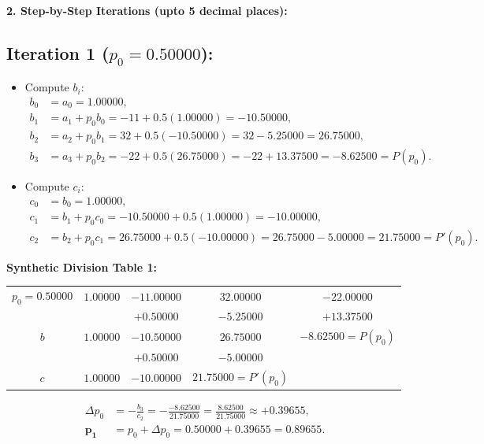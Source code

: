 \documentclass[11pt,a4paper]{article}
\begin{document}
\paragraph{2. Step-by-Step Iterations (upto 5 decimal places):}

\subsection*{Iteration 1 ($p_0 = 0.50000$):}
\begin{itemize}
    \item Compute $b_i$:
    \begin{align*}
    b_0 &= a_0 = 1.00000, \\
    b_1 &= a_1 + p_0 b_0 = -11 + 0.5(1.00000) = -10.50000, \\
    b_2 &= a_2 + p_0 b_1 = 32 + 0.5(-10.50000) = 32 - 5.25000 = 26.75000, \\
    b_3 &= a_3 + p_0 b_2 = -22 + 0.5(26.75000) = -22 + 13.37500 = \mathbf{-8.62500} = P(p_0).
    \end{align*}
    \item Compute $c_i$:
    \begin{align*}
    c_0 &= b_0 = 1.00000, \\
    c_1 &= b_1 + p_0 c_0 = -10.50000 + 0.5(1.00000) = -10.00000, \\
    c_2 &= b_2 + p_0 c_1 = 26.75000 + 0.5(-10.00000) = 26.75000 - 5.00000 = \mathbf{21.75000} = P'(p_0).
    \end{align*}
\end{itemize}

\noindent\textbf{Synthetic Division Table 1:}
\begin{center}
\begin{tabular}{c|cccc}
$p_0 = 0.50000$ & $1.00000$ & $-11.00000$ & $32.00000$ & $-22.00000$ \\
& & $+0.50000$ & $-5.25000$ & $+13.37500$ \\
\midrule
$b$ & $1.00000$ & $-10.50000$ & $26.75000$ & $\mathbf{-8.62500} = P(p_0)$ \\
& & $+0.50000$ & $-5.00000$ & \\
\midrule
$c$ & $1.00000$ & $-10.00000$ & $\mathbf{21.75000} = P'(p_0)$ & \\
\bottomrule
\end{tabular}
\end{center}

\begin{align*}
\Delta p_0 &= -\frac{b_3}{c_2} = -\frac{-8.62500}{21.75000} = \frac{8.62500}{21.75000} \approx +0.39655, \\
\mathbf{p_1} &= p_0 + \Delta p_0 = 0.50000 + 0.39655 = \mathbf{0.89655}.
\end{align*}
\end{document}
